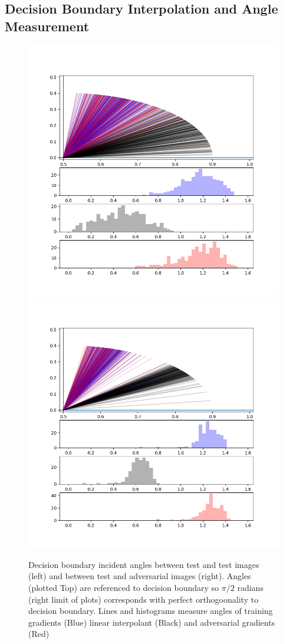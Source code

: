 
\subsection{Decision Boundary Interpolation and Angle Measurement} \label{subsec:dbe}

\begin{figure}[!ht]
\centering\includegraphics[width=0.50\linewidth, trim=1.5cm 1.5cm 2cm 2cm, clip]{c3_figures/stab-mnist-C32-100-100-10-0.001-200-eval-1e-06-db_interp-angles-1stquadall199.png}\includegraphics[width=0.50\linewidth, trim=1.5cm 1.5cm 2cm 2cm, clip]{c3_figures/stab-mnist-C32-100-100-10-0.001-200-eval-1e-06-attack-db_interp-angles-1stquadall199.png}

\caption{Decision boundary incident angles between test and test images (left) and between test and adversarial images (right). Angles (plotted Top) are referenced to decision boundary so $\pi/2$ radians (right limit of plots) corresponds with perfect orthogoonality to decision boundary. Lines and histograms measure angles of training gradients (Blue) linear interpolant (Black) and adversarial gradients (Red)}
\label{fig:dba}
\end{figure}

